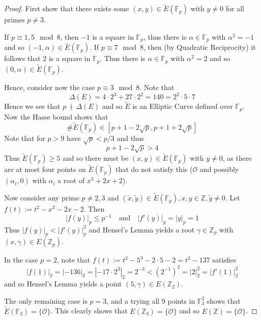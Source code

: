 \documentclass{scrartcl}
\newcommand{\Z}{\mathbb{Z}}
\newcommand{\F}{\mathbb{F}}
\renewcommand{\O}{\mathcal{O}}
\newcommand{\notdivides}{\ \nmid \ }
\theoremstyle{definition}
\begin{document}
\begin{proof}
    First show that there exists some $(x, y) \in \tilde{E}(\F_p)$ with $y \neq 0$ for all primes $p \neq 3$.

    If $p \equiv 1, 5 \mod 8$, then $-1$ is a square in $\F_p$, thus there is $\alpha \in \F_p$ with $\alpha^2 = -1$ and so $(-1, \alpha) \in \tilde{E}(\F_p)$.
    If $p \equiv 7 \mod 8$, then (by Quadratic Reciprocity) it follows that $2$ is a square in $\F_p$.
    Thus there is $\alpha \in \F_p$ with $\alpha^2 = 2$ and so $(0, \alpha) \in \tilde{E}(\F_p)$.

    Hence, consider now the case $p \equiv 3 \mod 8$.
    Note that
    \begin{equation*}
        \Delta(E) = 4 \cdot 2^3 + 27 \cdot 2^2 = 140 = 2^2 \cdot 5 \cdot 7
    \end{equation*}
    Hence we see that $p \notdivides \Delta(E)$ and so $\tilde{E}$ is an Elliptic Curve defined over $\F_p$.
    Now the Hasse bound shows that
    \begin{equation*}
        \#\tilde{E}(\F_p) \in [p + 1 - 2\sqrt{p}, p + 1 + 2\sqrt{p}]
    \end{equation*}
    Note that for $p > 9$ have $\sqrt{p} < p/3$ and thus
    \begin{equation*}
        p + 1 - 2\sqrt{p} > 4
    \end{equation*}
    Thus $\tilde{E}(\F_p) \geq 5$ and so there must be $(x, y) \in \tilde{E}(\F_p)$ with $y \neq 0$, as there are at most four points on $\tilde{E}(\F_p)$ that do not satisfy this ($\O$ and possibly $(\alpha_i, 0)$ with $\alpha_i$ a root of $x^3 + 2x + 2$).

    Now consider any prime $p \neq 2, 3$ and $(\tilde{x}, \tilde{y}) \in \tilde{E}(\F_p), x, y \in \Z, \tilde{y} \neq 0$.
    Let $f(t) := t^2 - x^3 - 2x - 2$.
    Then
    \begin{equation*}
        |f(y)|_p \leq p^{-1} \quad \text{and} \quad |f'(y)|_p = |y|_p = 1
    \end{equation*}
    Thus $|f(y)|_p < |f'(y)|_p^2$ and Hensel's Lemma yields a root $\gamma \in \Z_p$ with $(x, \gamma) \in E(\Z_p)$.

    In the case $p = 2$, note that $f(t) := t^2 - 5^3 - 2 \cdot 5 - 2 = t^2 - 137$ satisfies
    \begin{equation*}
        |f(1)|_2 = |-136|_2 = |-17 \cdot 2^3|_2 = 2^{-3} < \left( 2^{-1} \right)^2 = |2|_2^2 = |f'(1)|_2^2
    \end{equation*}
    and so Hensel's Lemma yields a point $(5, \gamma) \in E(\Z_2)$.

    The only remaining case is $p = 3$, and a trying all 9 points in $\F_3^2$ shows that $\tilde{E}(\F_3) = \{\O\}$.
    This clearly shows that $E(\Z_3) = \{ \O \}$ and so $E(\Z) = \{\O\}$.
\end{proof}
\end{document}
